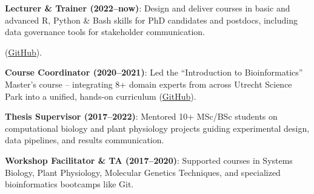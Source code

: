 \documentclass[a4paper,10pt]{article}
\begin{document}
\begin{description}
  \raggedright
  \item \textbf{Lecturer \& Trainer (2022–now)}: Design and deliver courses in 
    basic and advanced R, Python \& Bash skills for PhD candidates and postdocs, 
    including data governance tools for stakeholder communication.

    (\href{https://github.com/lauralwd/professional_education}{GitHub}).
  \item \textbf{Course Coordinator (2020–2021)}: Led the “Introduction to Bioinformatics” Master’s course 
    -- integrating 8+ domain experts 
    from across Utrecht Science Park into a unified, hands-on curriculum 
    (\href{https://lauralwd.github.io/metagenomicspractical/}{GitHub}).
  \item \textbf{Thesis Supervisor (2017–2022)}: Mentored 10+ MSc/BSc students on computational biology and 
    plant physiology projects guiding experimental design, data pipelines, and results communication.
  \item \textbf{Workshop Facilitator \& TA (2017–2020)}: Supported courses in Systems Biology, Plant Physiology, 
    Molecular Genetics Techniques, and specialized bioinformatics bootcamps like Git.
\end{description}
\end{document}
